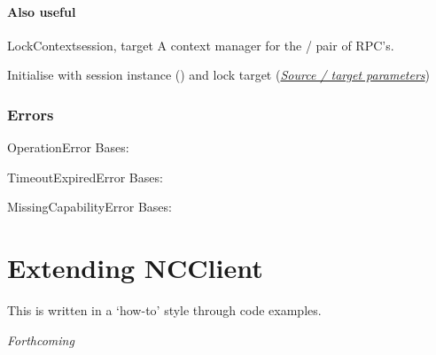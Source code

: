 \documentclass[a4paper,10pt,english]{manual}
\begin{document}
\subsubsection{Also useful}

\hypertarget{ncclient.operations.LockContext}{}\begin{classdesc}{LockContext}{session, target}
A context manager for the \hyperlink{ncclient.operations.Lock}{} / \hyperlink{ncclient.operations.Unlock}{} pair of RPC's.

Initialise with session instance (\hyperlink{ncclient.transport.Session}{}) and lock target (\hyperlink{source-target}{\emph{Source / target parameters}})
\end{classdesc}


\subsection{Errors}

\hypertarget{ncclient.operations.OperationError}{}\begin{excdesc}{OperationError}
Bases: 
\end{excdesc}

\hypertarget{ncclient.operations.TimeoutExpiredError}{}\begin{excdesc}{TimeoutExpiredError}
Bases: 
\end{excdesc}

\hypertarget{ncclient.operations.MissingCapabilityError}{}\begin{excdesc}{MissingCapabilityError}
Bases: 
\end{excdesc}

\resetcurrentobjects
\hypertarget{--doc-extending}{}

\hypertarget{extending}{}\chapter{Extending NCClient}

This is written in a `how-to' style through code examples.

\emph{Forthcoming}


\renewcommand{\indexname}{Module Index}
\printmodindex
\renewcommand{\indexname}{Index}
\printindex
\end{document}
